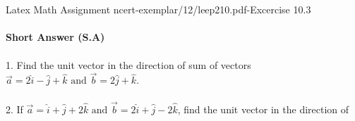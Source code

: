 \documentclass{article}
\begin{document}
\textbf{}\\
\\Latex Math Assignment ncert-exemplar/12/leep210.pdf-Excercise 10.3\\

\textbf{}\\
\textbf{Short Answer (S.A)}\\
\\
1. Find the unit vector in the direction of sum of vectors $\overrightarrow{a}=2\hat{i}-\hat{j}+\hat{k} \text{ and } \overrightarrow{b}=2\hat{j}+\hat{k}$.
\\
\\
2. If $\overrightarrow{a}=\hat{i}+\hat{j}+2\hat{k} \text{ and }\overrightarrow{b}=2\hat{i}+\hat{j}-2\hat{k}$, find the unit vector in the direction of\\
\end{document}
